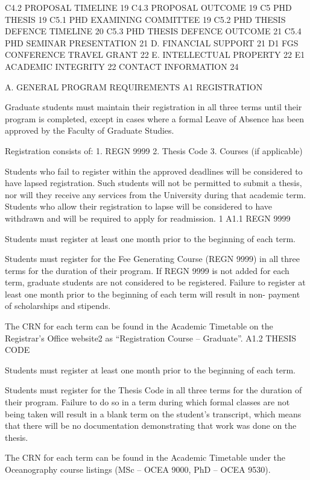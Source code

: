 C4.2	PROPOSAL TIMELINE	19
C4.3	PROPOSAL OUTCOME	19
C5	PHD THESIS	19
C5.1	PHD EXAMINING COMMITTEE	19
C5.2	PHD THESIS DEFENCE TIMELINE	20
C5.3	PHD THESIS DEFENCE OUTCOME	21
C5.4	PHD SEMINAR PRESENTATION	21
D.	FINANCIAL SUPPORT	21
D1	FGS CONFERENCE TRAVEL GRANT	22
E.	INTELLECTUAL PROPERTY	22
E1	ACADEMIC INTEGRITY	22
CONTACT INFORMATION	24
 

A.	GENERAL  PROGRAM REQUIREMENTS
A1	REGISTRATION

Graduate students must maintain their registration in all three terms until their program is completed, except in cases where a formal Leave of Absence has been approved by the Faculty of Graduate Studies.

Registration consists of:
1.	REGN 9999
2.	Thesis Code
3.	Courses (if applicable)

Students who fail to register within the approved deadlines will be considered to have lapsed registration. Such students will not be permitted to submit a thesis, nor will they receive any services from the University during that academic term. Students who allow their registration to lapse will be considered to have withdrawn and will be required to apply for readmission. 1
A1.1	REGN 9999

Students must register at least one month prior to the beginning of each term.

Students must register for the Fee Generating Course (REGN 9999) in all three terms for the duration of their program. If REGN 9999 is not added for each term, graduate students are not considered to be registered. Failure to register at least one month prior to the beginning of each term will result in non- payment of scholarships and stipends.

The CRN for each term can be found in the Academic Timetable on the Registrar’s Office website2 as “Registration Course – Graduate”.
A1.2	THESIS CODE

Students must register at least one month prior to the beginning of each term.

Students must register for the Thesis Code in all three terms for the duration of their program. Failure to do so in a term during which formal classes are not being taken will result in a blank term on the student’s transcript, which means that there will be no documentation demonstrating that work was done on the thesis.

The CRN for each term can be found in the Academic Timetable under the Oceanography course listings (MSc – OCEA 9000, PhD – OCEA 9530).




